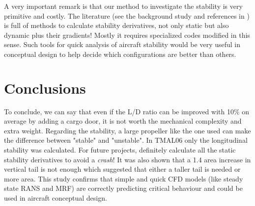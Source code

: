 \documentclass[11pt,a4paper,twoside,oneside]{article}
\begin{document}
A very important remark is that our method to investigate the stability is very primitive and costly. The literature (see the background study and references in \cite{stabil}) is full of methods to calculate stability derivatives, not only static but also dynamic plus their gradients! Mostly it requires specialized codes modified in this sense. Such tools for quick analysis of aircraft stability would be very useful in conceptual design to help decide which configurations are better than others.






\clearpage
\thispagestyle{plain}
\section{Conclusions}

To conclude, we can say that even if the L/D ratio can be improved with 10\% on average by adding a cargo door, it is not worth the mechanical complexity and extra weight. Regarding the stability, a large propeller like the one used can make the difference between "stable" and "unstable". In TMAL06 only the longitudinal stability was calculated. For future projects, definitely calculate all the static stability derivatives to avoid a \emph{crash}! It was also shown that a 1.4 area increase in vertical tail is not enough which suggested that either a taller tail is needed or more area. This study confirms that simple and quick CFD models (like steady state RANS and MRF) are correctly predicting critical behaviour and could be used in aircraft conceptual design.



\clearpage
\thispagestyle{plain}





\end{document}
